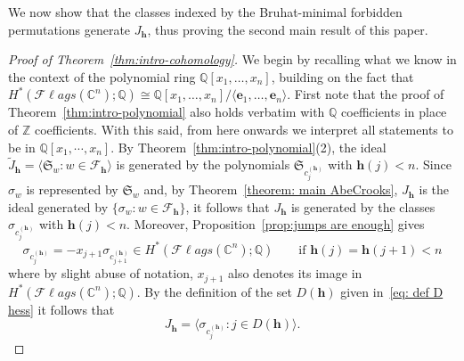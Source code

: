 \documentclass[11pt]{amsart}
\theoremstyle{plain}
\newenvironment{theoremproof}[1]
  {\begin{proof}[Proof of Theorem~\ref{#1}]}
  {\end{proof}}
\theoremstyle{definition}
\newcommand{\hess}{{\mathbf h}}
\newcommand{\Fl}{\mathcal{F}\ell ags}
\newcommand{\C}{\mathbb{C}}           %
\newcommand{\Z}{\mathbb{ Z}}           %
\newcommand{\Q}{\mathbb{ Q}}           %
\numberwithin{equation}{section}
\begin{document}
We now show that the classes indexed by the Bruhat-minimal forbidden permutations generate $J_\hess$, thus proving the second 
main result of this paper.



\begin{theoremproof}{thm:intro-cohomology}
We begin by recalling what we know in the context of the polynomial ring $\Q[x_1,\ldots,x_n]$, building on the fact that $H^*(\Fl(\C^n);\Q) \cong \Q[x_1,\ldots,x_n]/\langle \mathbf{e}_1,\ldots,\mathbf{e}_n\rangle$. First note that the proof of Theorem~\ref{thm:intro-polynomial} also holds verbatim with $\Q$ coefficients in place of $\Z$ coefficients. With this said, from here onwards we interpret all statements to be in $\Q[x_1,\cdots,x_n]$. By Theorem~\ref{thm:intro-polynomial}(2), the ideal $\tilde{J}_\hess = \langle \mathfrak{S}_w: w \in \mathcal{F}_\hess\rangle$ is
generated by the polynomials $\mathfrak{S}_{c_j^{(\hess)}}$ with
$\hess(j)<n$. Since $\sigma_w$ is represented by $\mathfrak{S}_w$ and, by Theorem~\ref{theorem: main AbeCrooks}, $J_\hess$ is the ideal generated by $\{\sigma_w : w\in\mathcal{F}_\hess\}$, it follows that $J_\hess$ is generated by the classes $\sigma_{c_j^{(\hess)}}$ with $\hess(j)<n$. Moreover, Proposition~\ref{prop:jumps are enough} gives
\[
\sigma_{c_j^{(\hess)}}
= -x_{j+1}\sigma_{c_{j+1}^{(\hess)}} \in H^{*}(\Fl(\C^n);\Q)
\qquad\text{if }\hess(j)=\hess(j+1)<n
\]
where by slight abuse of notation, $x_{j+1}$ also denotes its image in $H^*(\Fl(\C^n);\Q)$. By the definition of the set $D(\hess)$ given in~\eqref{eq: def D hess} it follows that 
\[
J_\hess=
\bigl\langle \sigma_{c_j^{(\hess)}}:j\in D(\hess)\bigr\rangle.
\]


\end{theoremproof}
\end{document}
